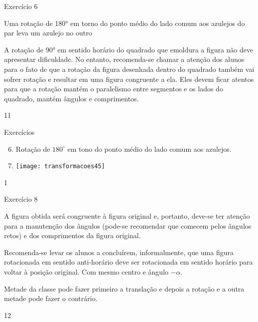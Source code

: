 \clearmargin
\begin{sugestions}{Exercício 6}
{
Uma rotação de 180° em torno do ponto médio do lado comum aos azulejos do par leva um azulejo no outro


A rotação de 90° em sentido horário do quadrado que emoldura a figura não deve apresentar dificuldade. No entanto, recomenda-se chamar a atenção dos alunos para o fato de que a rotação da figura desenhada dentro do quadrado também vai sofrer rotação e resultar em uma figura congruente a ela. Eles devem ficar atentos para que a rotação mantém o paralelismo entre segmentos e os lados do quadrado, mantém ângulos e comprimentos.    
}{1}{1}
\end{sugestions}
\begin{answer}{Exercícios}
{\exerciselist
\begin{enumerate}\setcounter{enumi}{5}
\item Rotação de $180^{\circ}$ em tono do ponto médio do lado comum aos azulejos.

\item {}
{
\texttt{[image: transformacoes45]}
}
\end{enumerate}
}{1}
\end{answer}
\clearmargin
\begin{sugestions}{Exercício 8}
{
A figura obtida será congruente à figura original e, portanto, deve-se ter atenção para a manutenção dos ângulos (pode-se recomendar que comecem pelos ângulos retos) e dos comprimentos da figura original.

Recomenda-se levar os alunos a concluírem, informalmente, que uma figura rotacionada em sentido anti-horário deve ser rotacionada em sentido horário para voltar à posição original. Com mesmo centro e ângulo $-\alpha$. 

Metade da classe pode fazer primeiro a translação e depois a rotação e a outra metade pode fazer o contrário. 
}{1}{2}
\end{sugestions}

